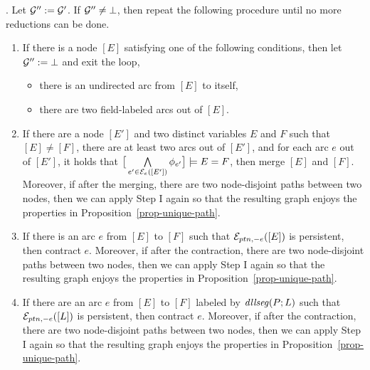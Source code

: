 \documentclass{llncs}
\begin{document}
\smallskip

. Let $\mathcal{G}'' :=\mathcal{G}'$. If $\mathcal{G}'' \neq \bot$, then repeat the following procedure until no more reductions can be done.
\begin{enumerate}
\item If there is a node $[E]$ satisfying one of the following conditions, then let $\mathcal{G}'':=\bot$ and exit the loop,
\begin{itemize}
\item there is an undirected arc from $[E]$ to itself,
%
\item there are two field-labeled arcs out of $[E]$.
\end{itemize}
%
\item If there are a node $[E']$ and two distinct variables $E$ and $F$ such that $[E] \neq [F]$,  there are at least two arcs out of $[E']$, and for each arc $e$ out of $[E']$, it holds that $\big [\bigwedge \limits_{e' \in \mathcal{E}_e([E'])} \phi_{e'} \big] \models E=F$, then merge $[E]$ and $[F]$. 
Moreover, if after the merging, there are two node-disjoint paths between two nodes,  then we can apply Step I again so that the resulting graph enjoys the properties in Proposition~\ref{prop-unique-path}.
%
\item If there is an arc $e$ from $[E]$ to $[F]$ such that $\mathcal{E}_{ptn,-e}([E])$ is persistent, then contract $e$. Moreover, if after the contraction, there are two node-disjoint paths between two nodes,  then we can apply Step I again so that the resulting graph enjoys the properties in Proposition~\ref{prop-unique-path}.
%
\item If there are an arc $e$ from $[E]$ to $[F]$ labeled by $\mathit{dllseg}(P;L)$ such that $\mathcal{E}_{ptn,-e}([L])$ is persistent, then contract $e$. Moreover, if after the contraction, there are two node-disjoint paths between two nodes,  then we can apply Step I again so that the resulting graph enjoys the properties in Proposition~\ref{prop-unique-path}.
%
\end{enumerate}
\end{document}
